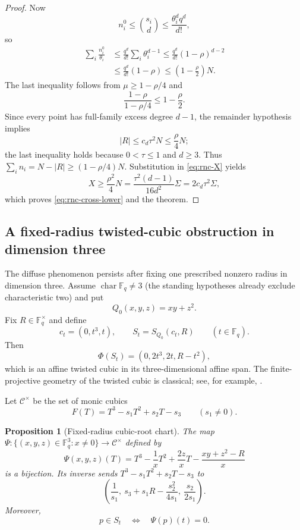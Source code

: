\documentclass[11pt,letterpaper]{amsart}
\newtheorem{proposition}[proposition]{Proposition}
\theoremstyle{definition}
\theoremstyle{remark}
\newcommand{\1}{\mathbf 1}
\begin{document}
\begin{proof}
Now
\[
 n_i^0\le\binom{s_i}{d}\le\frac{\theta_i^dq^d}{d!},
\]
so
\begin{align*}
 \sum_i\frac{n_i^0}{\theta_i}
 &\le\frac{q^d}{d!}\sum_i\theta_i^{d-1}
 \le\frac{q^d}{d!}(1-\rho)^{d-2}\\
 &\le\frac{q^d}{d!}(1-\rho)
 \le\left(1-\frac\rho2\right)N.
\end{align*}
The last inequality follows from $\mu\ge1-\rho/4$ and
\[
 \frac{1-\rho}{1-\rho/4}\le1-\frac\rho2.
\]
Since every point has full-family excess degree $d-1$, the remainder hypothesis implies
\[
 |R|\le c_d\tau^2N\le\frac\rho4N;
\]
the last inequality holds because $0<\tau\le1$ and $d\ge3$.
Thus $\sum_i n_i=N-|R|\ge(1-\rho/4)N$.  Substitution in \eqref{eq:rnc-X} yields
\[
 X\ge\frac{\rho^2}{4}N
 =\frac{\tau^2(d-1)}{16d^2}\Sigma
 =2c_d\tau^2\Sigma,
\]
which proves \eqref{eq:rnc-cross-lower} and the theorem.
\end{proof}

\subsection{A fixed-radius twisted-cubic obstruction in dimension three}\label{subsec:fixed-tc}

The diffuse phenomenon persists after fixing one prescribed nonzero radius in dimension three.  Assume $\operatorname{char}\mathbb F_q\ne3$ (the standing hypotheses already exclude characteristic two) and put
\[
 Q_0(x,y,z)=xy+z^2.
\]
Fix $R\in\mathbb F_q^\times$ and define
\begin{equation}\label{eq:tc-spheres}
 c_t=(0,t^3,t),
 \qquad
 S_t=S_{Q_0}(c_t,R)
 \qquad(t\in\mathbb F_q).
\end{equation}
Then
\begin{equation}\label{eq:tc-lift}
 \Phi(S_t)=(0,2t^3,2t,R-t^2),
\end{equation}
which is an affine twisted cubic in its three-dimensional affine span.  The finite-projective geometry of the twisted cubic is classical; see, for example, \cite{BDMP}.

Let $\mathcal C^\times$ be the set of monic cubics
\[
 F(T)=T^3-s_1T^2+s_2T-s_3
 \qquad(s_1\ne0).
\]

\begin{proposition}[Fixed-radius cubic-root chart]\label{prop:tc-chart}
The map $\Psi:\{(x,y,z)\in\mathbb F_q^3:x\ne0\}\to\mathcal C^\times$ defined by
\begin{equation}\label{eq:tc-chart}
 \Psi(x,y,z)(T)
 =T^3-\frac1xT^2+\frac{2z}{x}T-\frac{xy+z^2-R}{x}
\end{equation}
is a bijection.  Its inverse sends $T^3-s_1T^2+s_2T-s_3$ to
\begin{equation}\label{eq:tc-chart-inverse}
 \left(\frac1{s_1},\ s_3+s_1R-\frac{s_2^2}{4s_1},\ \frac{s_2}{2s_1}\right).
\end{equation}
Moreover,
\begin{equation}\label{eq:tc-root-incidence}
 p\in S_t\quad\Longleftrightarrow\quad\Psi(p)(t)=0.
\end{equation}
\end{proposition}
\end{document}
